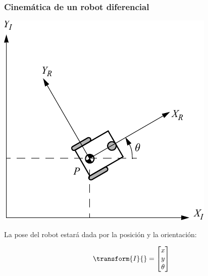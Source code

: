 \begin{frame}
    \frametitle{Cinemática de un robot diferencial}

    \begin{center}
        \includegraphics[width=0.4\columnwidth]{./images/coordinate_systems.pdf}
    \end{center}

    La pose del robot estará dada por la posición y la orientación:

    \begin{equation*}
        \transform{I}{} =
        \begin{bmatrix}
            x\\
            y\\
            \theta
        \end{bmatrix}
    \end{equation*}
\end{frame}


